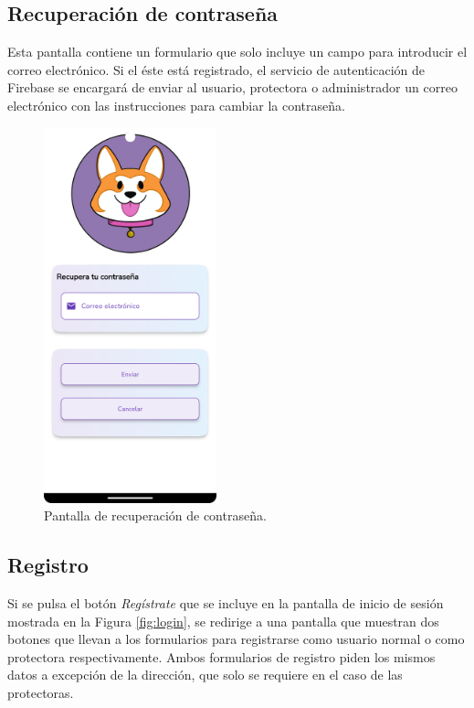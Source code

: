 \documentclass[a4paper, 12pt]{article}
\begin{document}
\newpage
\subsection*{Recuperación de contraseña}

Esta pantalla contiene un formulario que solo incluye un campo para introducir el correo electrónico. Si el éste está registrado, el servicio de autenticación de Firebase se encargará de enviar al usuario, protectora o administrador un correo electrónico con las instrucciones para cambiar la contraseña.

\begin{figure}[H]
	\begin{center}
		{\includegraphics[width=5cm]{app/RecoverPassword.png}\par}
		\caption{Pantalla de recuperación de contraseña.}
	\end{center}
\end{figure}

\newpage
\subsection*{Registro}

Si se pulsa el botón \textit{Regístrate} que se incluye en la pantalla de inicio de sesión mostrada en la Figura \ref{fig:login}, se redirige a una pantalla que muestran dos botones que llevan a los formularios para registrarse como usuario normal o como protectora respectivamente. Ambos formularios de registro piden los mismos datos a excepción de la dirección, que solo se requiere en el caso de las protectoras.
\end{document}

